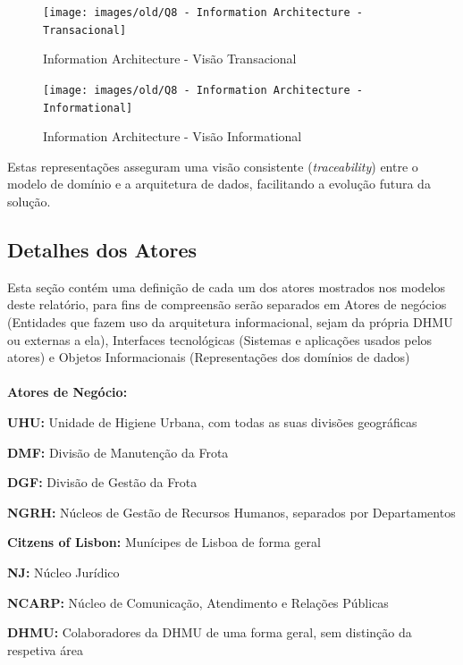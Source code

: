 \documentclass[12pt,a4paper,final]{article}
\begin{document}
    \begin{figure}[H]
        \centering
        \texttt{[image: images/old/Q8 - Information Architecture - Transacional]}
        \caption{Information Architecture - Visão Transacional}
        \label{fig:archi-full}
    \end{figure}

    \begin{figure}[H]
        \centering
        \texttt{[image: images/old/Q8 - Information Architecture - Informational]}
        \caption{Information Architecture - Visão Informational}
        \label{fig:archi-info}
    \end{figure}

    Estas representações asseguram uma visão consistente
    (\emph{traceability}) entre o modelo de domínio e a arquitetura de dados,
    facilitando a evolução futura da solução.

    \subsection*{Detalhes dos Atores}\label{subsec:information-atores}

    Esta seção contém uma definição de cada um dos atores mostrados nos modelos deste relatório, para fins de compreensão serão separados em Atores de negócios (Entidades que fazem uso da arquitetura informacional, sejam da própria DHMU ou externas a ela), Interfaces tecnológicas (Sistemas e aplicações usados pelos atores) e Objetos Informacionais (Representações dos domínios de dados)
\\
    \\
\textbf{Atores de Negócio:}

    \textbf{UHU:} Unidade de Higiene Urbana, com todas as suas divisões geográficas

    \textbf{DMF:} Divisão de Manutenção da Frota

    \textbf{DGF:} Divisão de Gestão da Frota

    \textbf{NGRH:} Núcleos de Gestão de Recursos Humanos, separados por Departamentos

    \textbf{Citzens of Lisbon:} Munícipes de Lisboa de forma geral

    \textbf{NJ:} Núcleo Jurídico

    \textbf{NCARP:} Núcleo de Comunicação, Atendimento e Relações Públicas

    \textbf{DHMU:} Colaboradores da DHMU de uma forma geral, sem distinção da respetiva área
\end{document}
